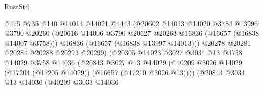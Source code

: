 \begin{lexlean}{RustStd}
\begin{coremodule}
                                        @475
                                        @735
                                        @140
                                        @14014
                                        @14021
                                        @4443
                                        (@20602
                                          @14013
                                          @14020
                                          @3784
                                          @13996
                                          @3790
                                          @20260
                                          (@20616
                                            @14006
                                            @3790
                                            @20627
                                            @20263
                                            @16836
                                            (@16657 (@16838 @14007 @3758)))
                                          @16836
                                          (@16657 (@16838 @13997 @14013)))
                                        @20278
                                        @20281
                                        @20284
                                        @20288
                                        @20293
                                        @20299)
                                      (@20305
                                        @14023
                                        @3027
                                        @3034
                                        @13
                                        @3758
                                        @14029
                                        @3758
                                        @14036
                                        (@20843
                                          @3027
                                          @13
                                          @14029
                                          (@40209
                                            @3026
                                            @14029
                                            (@17204 (@17205 @14029))
                                            (@16657 (@17210 @3026 @13))))
                                        (@20843
                                          @3034
                                          @13
                                          @14036
                                          (@40209
                                            @3033
                                            @14036

\end{coremodule}
\end{lexlean}
